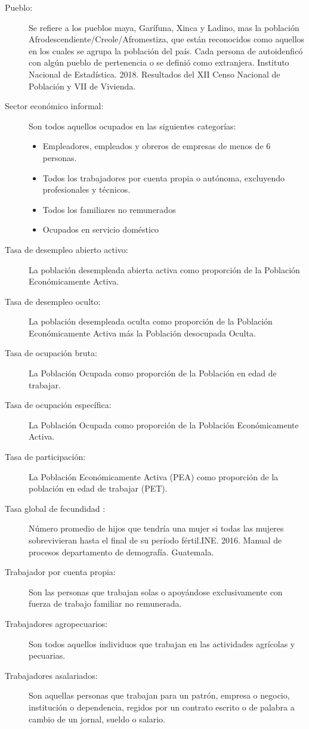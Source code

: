 \begin{description}
	\item[Pueblo:] Se refiere a los pueblos maya, Garífuna, Xinca y Ladino, mas la población Afrodescendiente/Creole/Afromestiza, que están reconocidos como aquellos en los cuales se agrupa la población del país. Cada persona de autoidenficó con algún pueblo de pertenencia o se definió como extranjera. Instituto Nacional de Estadística. 2018. Resultados del XII Censo Nacional de Población y VII de Vivienda.
	\item[Sector económico informal:] Son todos aquellos ocupados en las siguientes categorías:
	\begin{itemize}\itemsep -1pt
		\item	Empleadores, empleados y obreros de empresas de menos de 6 personas.
		\item	Todos los trabajadores por cuenta propia o autónoma, excluyendo profesionales y técnicos. 
		\item	Todos los familiares no remunerados
		\item	Ocupados en servicio doméstico
	\end{itemize}
	\item[Tasa de desempleo abierto activo:] La población desempleada abierta activa como proporción de la Población Económicamente Activa.
	\item[Tasa de desempleo oculto:] La población desempleada oculta como proporción de la Población Económicamente Activa más la Población desocupada Oculta.
	\item[Tasa de ocupación bruta:] La Población Ocupada como proporción de la Población en edad de trabajar.
	\item[Tasa de ocupación específica:] La Población Ocupada como proporción de la Población Económicamente Activa.
	\item[Tasa de participación:] La Población Económicamente Activa (PEA) como proporción de la población en edad de trabajar (PET).
	\item[Tasa global de fecundidad :]Número promedio de hijos que tendría una mujer si todas las mujeres sobrevivieran hasta el final de su período fértil.INE. 2016. Manual de procesos departamento de demografía. Guatemala.
	\item[Trabajador por cuenta propia:] Son las personas que trabajan solas o apoyándose exclusivamente con fuerza de trabajo familiar no remunerada.
	\item[Trabajadores agropecuarios:] Son todos aquellos individuos que trabajan en las actividades agrícolas y pecuarias.
	\item[Trabajadores asalariados:] Son aquellas personas que trabajan para un patrón, empresa o negocio, institución o dependencia, regidos por un contrato escrito o de palabra a cambio de un jornal, sueldo o salario. 

\end{description}
